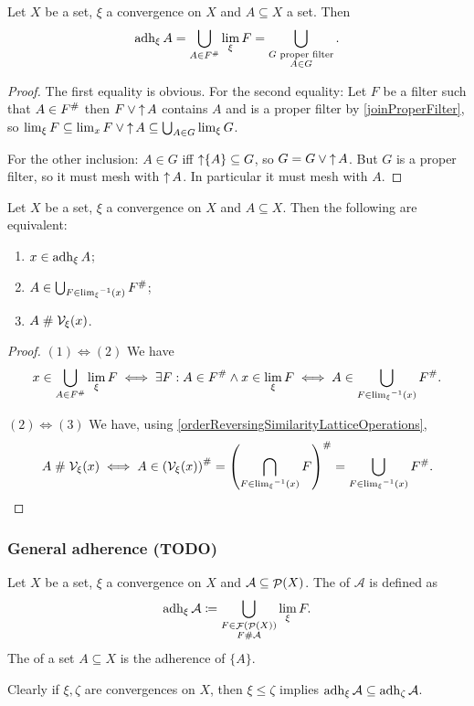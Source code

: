 \begin{lemma}
Let $X$ be a set, $\xi$ a convergence on $X$ and $A \subseteq X$ a set. Then
\[ \operatorname{adh}_\xi A = \bigcup_{A \in F^{\mathrel{\#}}}\lim_\xi F = \bigcup_{\substack{\text{$G$ proper filter} \\ A\in G}}. \]
\end{lemma}
\begin{proof}
The first equality is obvious. For the second equality: Let $F$ be a filter such that $A\in F^{\mathrel{\#}}$ then $F \vee \mathop{\uparrow} A$ contains $A$ and is a proper filter by \ref{joinProperFilter}, so $\lim_\xi F \subseteq \lim_x F \vee \mathop{\uparrow} A \subseteq \bigcup_{A\in G}\lim_\xi G$.

For the other inclusion: $A\in G$ iff $\mathop{\uparrow}\{A\} \subseteq G$, so $G = G \vee \mathop{\uparrow} A$. But $G$ is a proper filter, so it must mesh with $\mathop{\uparrow} A$. In particular it must mesh with $A$.
\end{proof}



\begin{proposition}
Let $X$ be a set, $\xi$ a convergence on $X$ and $A \subseteq X$. Then the following are equivalent:
\begin{enumerate}
\item $x\in \operatorname{adh}_\xi A$;
\item $A\in \bigcup_{F\in {\lim_\xi}^{-1}(x)} F^{\mathrel{\#}}$;
\item $A \mathrel{\#} \mathcal{V}_\xi(x)$.
\end{enumerate}
\end{proposition}
\begin{proof}
$(1) \Leftrightarrow (2)$ We have
\[ x\in \bigcup_{A\in F^{\mathrel{\#}}}\lim_\xi F \iff \exists F: A \in F^{\mathrel{\#}} \land x\in \lim_\xi F \iff A\in  \bigcup_{F\in {\lim_\xi}^{-1}(x)} F^{\mathrel{\#}}. \]

$(2) \Leftrightarrow (3)$ We have, using \ref{orderReversingSimilarityLatticeOperations},
\[ A \mathrel{\#} \mathcal{V}_\xi(x) \iff A\in \left(\mathcal{V}_\xi(x)\right)^{\mathrel{\#}} = \left(\bigcap_{F\in {\lim_\xi}^{-1}(x)}F\right)^{\mathrel{\#}} = \bigcup_{F\in {\lim_\xi}^{-1}(x)} F^{\mathrel{\#}}. \]
\end{proof}

\subsubsection{General adherence (TODO)}
\begin{definition}
Let $X$ be a set, $\xi$ a convergence on $X$ and $\mathcal{A} \subseteq \mathop{\mathcal{P}}(X)$. The  of $\mathcal{A}$ is defined as
\[ \operatorname{adh}_\xi\mathcal{A} \coloneqq \bigcup_{\substack{F \in \mathop{\mathcal{F}}(\mathop{\mathcal{P}}(X)) \\ F \mathrel{\#} \mathcal{A}}} \lim_\xi F. \]
The  of a set $A\subseteq X$ is the adherence of $\{A\}$.
\end{definition}
Clearly if $\xi,\zeta$ are convergences on $X$, then $\xi \leq \zeta$ implies $\operatorname{adh}_\xi\mathcal{A} \subseteq \operatorname{adh}_\zeta\mathcal{A}$.

